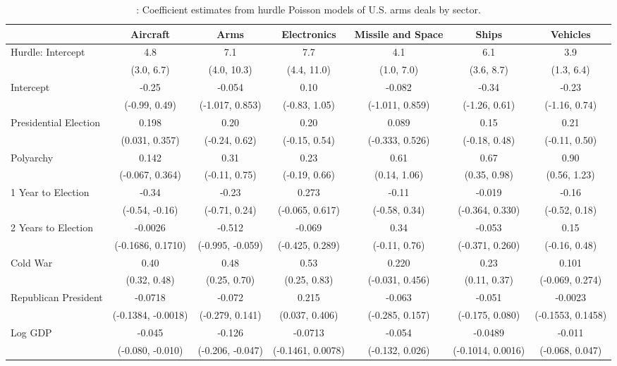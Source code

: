 \begin{table}[H]

\caption{\label{tab:pois-regs-sector}: Coefficient estimates from hurdle Poisson models of U.S. arms deals by sector.}
\centering
\fontsize{8}{10}\selectfont
\begin{tabular}[t]{lcccccc}
\toprule
  & Aircraft & Arms & Electronics & Missile and Space & Ships & Vehicles\\
\midrule
Hurdle: Intercept & 4.8 & 7.1 & 7.7 & 4.1 & 6.1 & 3.9\\
 & (3.0, 6.7) & (4.0, 10.3) & (4.4, 11.0) & (1.0, 7.0) & (3.6, 8.7) & (1.3, 6.4)\\
Intercept & -0.25 & -0.054 & 0.10 & -0.082 & -0.34 & -0.23\\
 & (-0.99, 0.49) & (-1.017, 0.853) & (-0.83, 1.05) & (-1.011, 0.859) & (-1.26, 0.61) & (-1.16, 0.74)\\
Presidential Election & 0.198 & 0.20 & 0.20 & 0.089 & 0.15 & 0.21\\
 & (0.031, 0.357) & (-0.24, 0.62) & (-0.15, 0.54) & (-0.333, 0.526) & (-0.18, 0.48) & (-0.11, 0.50)\\
Polyarchy & 0.142 & 0.31 & 0.23 & 0.61 & 0.67 & 0.90\\
 & (-0.067, 0.364) & (-0.11, 0.75) & (-0.19, 0.66) & (0.14, 1.06) & (0.35, 0.98) & (0.56, 1.23)\\
1 Year to Election & -0.34 & -0.23 & 0.273 & -0.11 & -0.019 & -0.16\\
 & (-0.54, -0.16) & (-0.71, 0.24) & (-0.065, 0.617) & (-0.58, 0.34) & (-0.364, 0.330) & (-0.52, 0.18)\\
2 Years to Election & -0.0026 & -0.512 & -0.069 & 0.34 & -0.053 & 0.15\\
 & (-0.1686, 0.1710) & (-0.995, -0.059) & (-0.425, 0.289) & (-0.11, 0.76) & (-0.371, 0.260) & (-0.16, 0.48)\\
Cold War & 0.40 & 0.48 & 0.53 & 0.220 & 0.23 & 0.101\\
 & (0.32, 0.48) & (0.25, 0.70) & (0.25, 0.83) & (-0.031, 0.456) & (0.11, 0.37) & (-0.069, 0.274)\\
Republican President & -0.0718 & -0.072 & 0.215 & -0.063 & -0.051 & -0.0023\\
 & (-0.1384, -0.0018) & (-0.279, 0.141) & (0.037, 0.406) & (-0.285, 0.157) & (-0.175, 0.080) & (-0.1553, 0.1458)\\
Log GDP & -0.045 & -0.126 & -0.0713 & -0.054 & -0.0489 & -0.011\\
 & (-0.080, -0.010) & (-0.206, -0.047) & (-0.1461, 0.0078) & (-0.132, 0.026) & (-0.1014, 0.0016) & (-0.068, 0.047)\\

\end{tabular}
\end{table}
